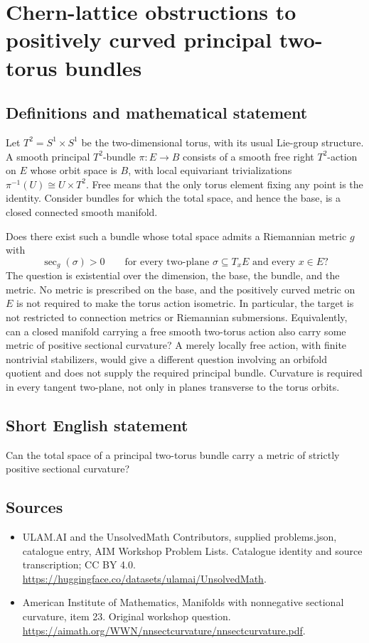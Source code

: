 \documentclass[11pt,a4paper]{article}
\begin{document}
\section*{Chern-lattice obstructions to positively curved principal two-torus bundles}\label{statement}

\subsection{Definitions and mathematical statement}
Let $T^2=S^1\times S^1$ be the two-dimensional torus, with its usual Lie-group structure.
A smooth principal $T^2$-bundle $\pi:E\to B$ consists of a smooth free right $T^2$-action on $E$ whose orbit space is $B$, with local equivariant trivializations $\pi^{-1}(U)\cong U\times T^2$.
Free means that the only torus element fixing any point is the identity.
Consider bundles for which the total space, and hence the base, is a closed connected smooth manifold.

Does there exist such a bundle whose total space admits a Riemannian metric $g$ with
\[
 \sec_g(\sigma)>0
 \qquad\text{for every two-plane }\sigma\subseteq T_xE
 \text{ and every }x\in E?
\]
The question is existential over the dimension, the base, the bundle, and the metric.
No metric is prescribed on the base, and the positively curved metric on $E$ is not required to make the torus action isometric.
In particular, the target is not restricted to connection metrics or Riemannian submersions.
Equivalently, can a closed manifold carrying a free smooth two-torus action also carry some metric of positive sectional curvature?
A merely locally free action, with finite nontrivial stabilizers, would give a different question involving an orbifold quotient and does not supply the required principal bundle.
Curvature is required in every tangent two-plane, not only in planes transverse to the torus orbits.
\subsection{Short English statement}
Can the total space of a principal two-torus bundle carry a metric of strictly positive sectional curvature?
\subsection{Sources}
\begin{itemize}
\item[S1] ULAM.AI and the UnsolvedMath Contributors, supplied problems.json, catalogue entry, AIM Workshop Problem Lists. Catalogue identity and source transcription; CC BY 4.0.
\url{https://huggingface.co/datasets/ulamai/UnsolvedMath}.
\item[S2] American Institute of Mathematics, Manifolds with nonnegative sectional curvature, item 23. Original workshop question.
\url{https://aimath.org/WWN/nnsectcurvature/nnsectcurvature.pdf}.
\end{itemize}
\end{document}
